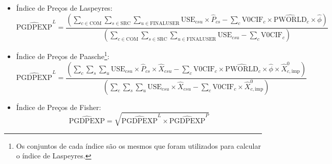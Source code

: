 \documentclass[12pt,twoside]{article}
\let\rmarkdownfootnote\footnote%
\def\footnote{\protect\rmarkdownfootnote}
\begin{document}
\begin{itemize}
\item
  Índice de Preços de Laspeyres: \[
  \hat{\text{PGDPEXP}}^L = \frac{\left(\sum_{c \in \text{COM}} \sum_{s \in \text{SRC}} \sum_{u \in \text{FINALUSER}} \text{USE}_{csu} \times \hat{P}_{cs} - \sum_c \text{V0CIF}_c  \times \hat{\text{PWORLD}}_c \times \hat{\phi}\right)}{\left(\sum_{c \in \text{COM}} \sum_{s \in \text{SRC}} \sum_{u \in \text{FINALUSER}} \text{USE}_{csu} - \sum_c \text{V0CIF}_c\right)}
  \]
\item
  Índice de Preços de Paasche\footnote{Os conjuntos de cada índice são
    os mesmos que foram utilizados para calcular o índice de Laspeyres.}:
  \[
  \hat{\text{PGDPEXP}}^L = \frac{\left(\sum_{c} \sum_{s} \sum_{u} \text{USE}_{csu} \times \hat{P}_{cs} \times \hat{X}_{csu} - \sum_c \text{V0CIF}_c  \times \hat{\text{PWORLD}}_c \times \hat{\phi} \times \hat{X}^0_{c,\text{imp}}\right)}{\left(\sum_{c} \sum_{s} \sum_{u} \text{USE}_{csu} \times \hat{X}_{csu} - \sum_c \text{V0CIF}_c \times \hat{X}^0_{c,\text{imp}}\right)}
  \]
\item
  Índice de Preços de Fisher:
  \[\hat{\text{PGDPEXP}} = \sqrt{\hat{\text{PGDPEXP}}^L \times \hat{\text{PGDPEXP}}^P}\]
\end{itemize}
\end{document}
